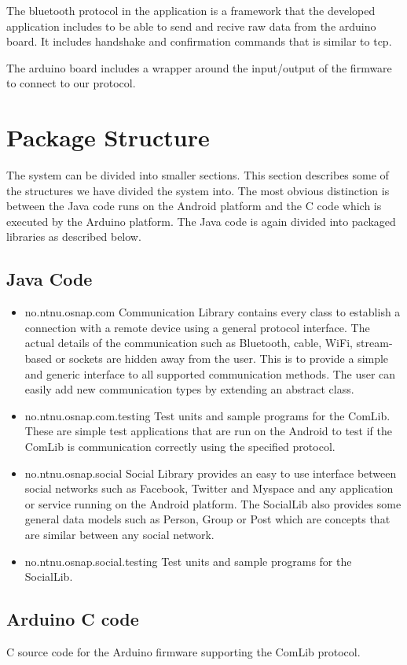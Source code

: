The bluetooth protocol in the application is a framework that the developed application includes
to be able to send and recive raw data from the arduino board. It includes handshake and
confirmation commands that is similar to tcp.

The arduino board includes a wrapper around the input/output of the firmware to connect to our protocol.

\section{Package Structure}
The system can be divided into smaller sections. This section describes some of the structures
we have divided the system into. The most obvious distinction is between the Java code runs
on the Android platform and the C code which is executed by the Arduino platform.
The Java code is again divided into packaged libraries as described below.

\subsection{Java Code}
\begin{itemize}
\item{no.ntnu.osnap.com}\newline
Communication Library contains every class to establish a connection with a remote device using a general protocol interface. The actual details of the communication such as
Bluetooth, cable, WiFi, stream-based or sockets are hidden away from the user. This is to provide a simple and generic interface to all supported communication methods. The
user can easily add new communication types by extending an abstract class.
\item{no.ntnu.osnap.com.testing}\newline
Test units and sample programs for the ComLib. These are simple test applications that are run on the Android to test if the ComLib is communication correctly using the specified
protocol.
\item{no.ntnu.osnap.social}\newline
Social Library provides an easy to use interface between social networks such as Facebook, Twitter and Myspace and any application or service running on the Android platform.
The SocialLib also provides some general data models such as Person, Group or Post which are concepts that are similar between any social network. 
\item{no.ntnu.osnap.social.testing}  \newline
Test units and sample programs for the SocialLib.
\end{itemize}

\subsection{Arduino C code}
C source code for the Arduino firmware supporting the ComLib protocol.
